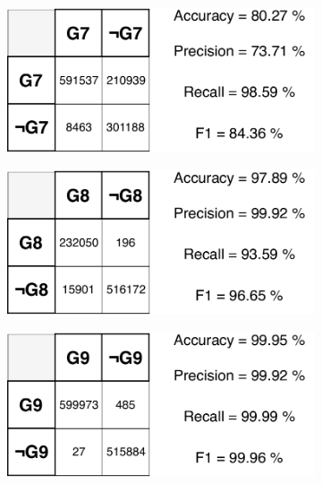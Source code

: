 \begin{figure}[H]
\vspace{3mm}
\begin{subfigure}{.33\textwidth}
  \centering
  \includegraphics[width=\textwidth]{tex/images/results/rese_g7_512}  
\end{subfigure}%
\begin{subfigure}{.33\textwidth}
  \centering
  \includegraphics[width=\textwidth]{tex/images/results/rese_g8_512}
\end{subfigure}
\begin{subfigure}{.33\textwidth}
  \centering
  \includegraphics[width=\textwidth]{tex/images/results/rese_g9_512}
\end{subfigure}


\end{figure}
